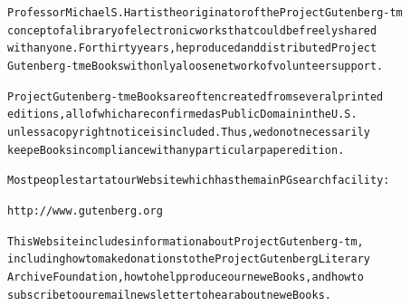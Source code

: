 \documentclass[12pt]{book}[2005/09/16]
\newenvironment{PGtext}{%
\begin{alltt}
\fontsize{8.1}{9}\ttfamily\selectfont}%
{\end{alltt}}
\begin{document}
\begin{PGtext}
Professor Michael S. Hart is the originator of the Project Gutenberg-tm
concept of a library of electronic works that could be freely shared
with anyone.  For thirty years, he produced and distributed Project
Gutenberg-tm eBooks with only a loose network of volunteer support.


Project Gutenberg-tm eBooks are often created from several printed
editions, all of which are confirmed as Public Domain in the U.S.
unless a copyright notice is included.  Thus, we do not necessarily
keep eBooks in compliance with any particular paper edition.


Most people start at our Web site which has the main PG search facility:

     http://www.gutenberg.org

This Web site includes information about Project Gutenberg-tm,
including how to make donations to the Project Gutenberg Literary
Archive Foundation, how to help produce our new eBooks, and how to
subscribe to our email newsletter to hear about new eBooks.
\end{PGtext}

\end{document}
